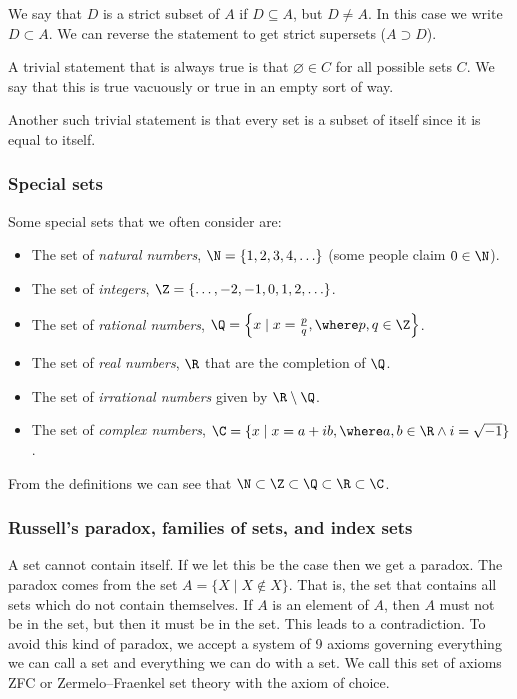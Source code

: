 We say that \(D\) is a strict subset of \(A\) if \(D \subseteq A\), but
\(D \not= A\). In this case we write \(D \subset A\). We can reverse the
statement to get strict supersets (\(A\supset D\)).

A trivial statement that is always true is that \(\varnothing \in C\)
for all possible sets \(C\). We say that this is true vacuously or true
in an empty sort of way.

Another such trivial statement is that every set is a subset of itself
since it is equal to itself.

\hypertarget{special-sets}{%
\subsubsection{Special sets}\label{special-sets}}

Some special sets that we often consider are:

\begin{itemize}
\tightlist
\item
  The set of \emph{natural numbers}, \(\N = \{1,2,3,4,\ldots\}\) (some
  people claim \(0 \in \N\)).
\item
  The set of \emph{integers}, \(\Z = \{\ldots,-2,-1,0,1,2,\ldots\}\).
\item
  The set of \emph{rational numbers},
  \(\Q = \left\{x \mid x = \frac{p}{q}, \where p,q \in \Z \right\}\).
\item
  The set of \emph{real numbers}, \(\R\) that are the completion of
  \(\Q\).
\item
  The set of \emph{irrational numbers} given by \(\R \setminus \Q\).
\item
  The set of \emph{complex numbers},
  \(\C = \{x \mid x = a + ib, \where a,b \in \R \land i = \sqrt{-1}\}\).
\end{itemize}

From the definitions we can see that
\(\N \subset \Z \subset \Q \subset \R \subset \C\).

\hypertarget{russells-paradox-families-of-sets-and-index-sets}{%
\subsubsection{Russell's paradox, families of sets, and index
sets}\label{russells-paradox-families-of-sets-and-index-sets}}

A set cannot contain itself. If we let this be the case then we get a
paradox. The paradox comes from the set \(A = \{X \mid X \not\in X \}\).
That is, the set that contains all sets which do not contain themselves.
If \(A\) is an element of \(A\), then \(A\) must not be in the set, but
then it must be in the set. This leads to a contradiction. To avoid this
kind of paradox, we accept a system of 9 axioms governing everything we
can call a set and everything we can do with a set. We call this set of
axioms ZFC or Zermelo--Fraenkel set theory with the axiom of choice.

